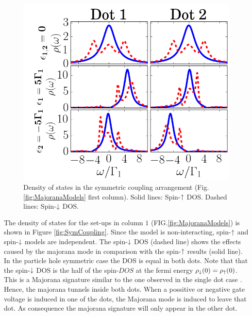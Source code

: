 \documentclass[showpacs,aps,prb,reprint,superscriptaddress]{revtex4-1}
\begin{document}
\begin{figure}[bt]
\begin{center}
\includegraphics[scale=0.48]{Graficos/t1=t2.png}
\caption{ \label{fig:SymCoupling}  Density of states in the symmetric coupling arrangement (Fig.\ref{fig:MajoranaModels} first column). Solid lines: Spin-$\uparrow$ DOS. Dashed lines: Spin-$\downarrow$ DOS.  
}
%
\label{fig:GenModel}
\end{center}
\end{figure}
     
     
     The density of states for the set-ups in column $1$ (FIG.\ref{fig:MajoranaModels}) is shown in Figure \ref{fig:SymCoupling}. Since the model is non-interacting, spin-$\uparrow$ and spin-$\downarrow$ models are independent. The spin-$\downarrow$ DOS (dashed line) shows the effects caused by the majorana mode in comparison with the spin-$\uparrow$  results (solid line). In the particle hole symmetric case the DOS is equal in both dots. Note that that the spin-$\downarrow$ DOS is the half of the spin-$DOS$ at the fermi energy $\rho_\downarrow(0) = \rho_\uparrow(0)$. This is a Majorana signature similar to the one observed in the single dot case \cite{liu_detecting_2011}. Hence, the majorana tunnels inside both dots. When a possitive or negative gate voltage is induced in one of the dots,  the Majorana mode is induced to leave that dot. As consequence the majorana signature will only appear in the other dot. 
     
\end{document}
